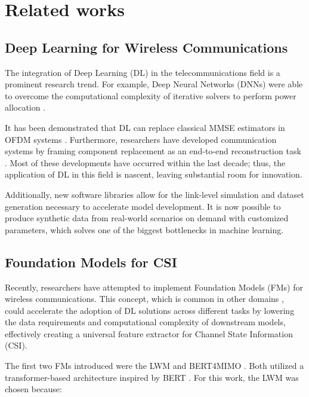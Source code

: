 \chapter{Related works}\label{sec:related_works}

\section{Deep Learning for Wireless Communications}

The integration of Deep Learning (DL) in the telecommunications field is a prominent research trend. For example, Deep Neural Networks (DNNs) were able to overcome the computational complexity of iterative solvers to perform power allocation \cite{sun2018learning}.

It has been demonstrated that DL can replace classical MMSE estimators in OFDM systems \cite{ye2018power}. Furthermore, researchers have developed communication systems by framing component replacement as an end-to-end reconstruction task \cite{oshea2017introduction}. Most of these developments have occurred within the last decade; thus, the application of DL in this field is nascent, leaving substantial room for innovation.

Additionally, new software libraries \cite{sionna} allow for the link-level simulation and dataset generation necessary to accelerate model development. It is now possible to produce synthetic data from real-world scenarios on demand with customized parameters, which solves one of the biggest bottlenecks in machine learning.

\section{Foundation Models for CSI}

Recently, researchers have attempted to implement Foundation Models (FMs) for wireless communications. This concept, which is common in other domains \cite{gpt3}, could accelerate the adoption of DL solutions across different tasks by lowering the data requirements and computational complexity of downstream models, effectively creating a universal feature extractor for Channel State Information (CSI).

The first two FMs introduced were the LWM \cite{alikhani2025lwm} and BERT4MIMO \cite{catak2025bert4mimofoundationmodelusing}. Both utilized a transformer-based architecture inspired by BERT \cite{devlin2018bert}. For this work, the LWM was chosen because:


